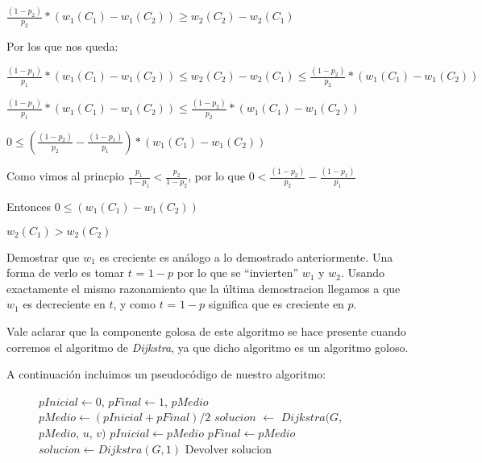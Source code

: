 $\frac{(1-p_2)}{p_2}*(w_1(C_1) - w_1(C_2)) \geq  w_2(C_2) - w_2(C_1) $

Por los que nos queda:

$\frac{(1-p_1)}{p_1}*(w_1(C_1) - w_1(C_2)) \leq  w_2(C_2) - w_2(C_1) \leq \frac{(1-p_2)}{p_2}*(w_1(C_1) - w_1(C_2))$

$\frac{(1-p_1)}{p_1}*(w_1(C_1) - w_1(C_2)) \leq \frac{(1-p_2)}{p_2}*(w_1(C_1) - w_1(C_2))$

$ 0 \leq (\frac{(1-p_2)}{p_2} - \frac{(1-p_1)}{p_1})*(w_1(C_1) - w_1(C_2))$

Como vimos al princpio $\frac{p_1}{1-p_1} < \frac{p_2}{1-p_2}$, por lo que $0 < \frac{(1-p_2)}{p_2} - \frac{(1-p_1)}{p_1} $

Entonces $ 0 \leq (w_1(C_1) - w_1(C_2))$

$w_2(C_1) > w_2(C_2)$

Demostrar que $w_1$ es creciente es análogo a lo demostrado anteriormente. Una forma de verlo es tomar $t$ = $1-p$ por lo que se ``invierten'' $w_1$ y $w_2$. Usando exactamente el mismo razonamiento que la última demostracion llegamos a que $w_1$ es decreciente en $t$, y como $t$ = $1-p$ significa que es creciente en $p$.

Vale aclarar que la componente golosa de este algoritmo se hace presente cuando corremos el algoritmo de \emph{Dijkstra}, ya que dicho algoritmo es un algoritmo goloso.

A continuación incluimos un pseudocódigo de nuestro algoritmo:

\begin{center}
 \begin{figure}[H]
  \begin{pseudo}
    \State $pInicial \leftarrow 0$, $pFinal \leftarrow 1$, $pMedio$
      \State $pMedio \leftarrow (pInicial + pFinal)/2$
      \State $solucion$ $\leftarrow$ $Dijkstra(G$, $pMedio$, $u$, $v)$
	 \State $pInicial \leftarrow pMedio$
      \Else
	 \State $pFinal \leftarrow pMedio$
      \EndIf
    \EndFor
      \State $solucion \leftarrow Dijkstra(G, 1)$
    \EndIf
    \State Devolver solucion
   \EndProcedure
  \end{pseudo}
 \end{figure}
\end{center}